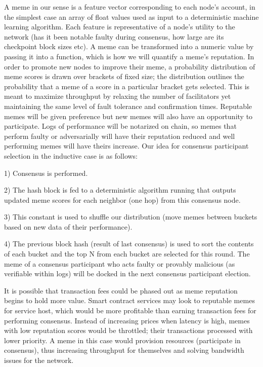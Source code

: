 \documentclass{article}
\begin{document}
A meme in our sense is a feature vector corresponding to each node's account, in the simplest case an array of float values used as input to a deterministic machine learning algorithm. Each feature is representative of a node's utility to the network (has it been notable faulty during consensus, how large are its checkpoint block sizes etc). A meme can be transformed into a numeric value by passing it into a function, which is how we will quantify a meme's reputation. In order to promote new nodes to improve their meme, a probability distribution of meme scores is drawn over brackets of fixed size; the distribution outlines the probability that a meme of a score in a particular bracket gets selected. This is meant to maximize throughput by relaxing the number of facilitators yet maintaining the same level of fault tolerance and confirmation times. Reputable memes will be given preference but new memes will also have an opportunity to participate. Logs of performance will be notarized on chain, so memes that perform faulty or adversarially will have their reputation reduced and well performing memes will have theirs increase. Our idea for consensus participant selection in the inductive case is as follows:

1) Consensus is performed. 

2) The hash block is fed to a deterministic algorithm running that outputs updated meme scores for each neighbor (one hop) from this consensus node. 

3) This constant is used to shuffle our distribution (move memes between buckets based on new data of their performance). 

4) The previous block hash (result of last consensus) is used to sort the contents of each bucket and the top N from each bucket are selected for this round. The meme of a consensus participant who acts faulty or provably malicious (as verifiable within logs) will be docked in the next consensus participant election.

It is possible that transaction fees could be phased out as meme reputation begins to hold more value. Smart contract services may look to reputable memes for service host, which would be more profitable than earning transaction fees for performing consensus. Instead of increasing prices when latency is high, memes with low reputation scores would be throttled; their transactions processed with lower priority. A meme in this case would provision resources (participate in consensus), thus increasing throughput for themselves and solving bandwidth issues for the network. 
\end{document}
